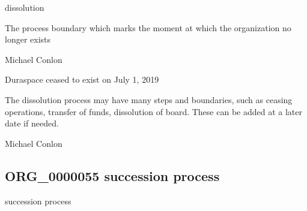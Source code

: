 \documentclass[letterpaper,10pt,english]{sphinxmanual}
\begin{document}
\begin{sphinxShadowBox}

\sphinxAtStartPar
dissolution
\end{sphinxShadowBox}

\begin{sphinxShadowBox}

\sphinxAtStartPar
The process boundary which marks the moment at which the organization no longer exists
\end{sphinxShadowBox}

\begin{sphinxShadowBox}

\sphinxAtStartPar
Michael Conlon 
\end{sphinxShadowBox}

\begin{sphinxShadowBox}

\sphinxAtStartPar
Duraspace ceased to exist on July 1, 2019
\end{sphinxShadowBox}

\begin{sphinxShadowBox}

\sphinxAtStartPar
The dissolution process may have many steps and boundaries, such as ceasing operations, transfer of funds, dissolution of board.  These can be added at a later date if needed.
\end{sphinxShadowBox}

\begin{sphinxShadowBox}

\sphinxAtStartPar
Michael Conlon 
\end{sphinxShadowBox}
\begin{quote}

\ignorespaces \end{quote}


\subsection{ORG\_0000055 \sphinxhyphen{} succession process}
\label{\detokenize{doc-ORG_0000055:org-0000055-succession-process}}\label{\detokenize{doc-ORG_0000055:index-0}}\label{\detokenize{doc-ORG_0000055::doc}}
\begin{sphinxShadowBox}

\sphinxAtStartPar
succession process
\end{sphinxShadowBox}
\end{document}
